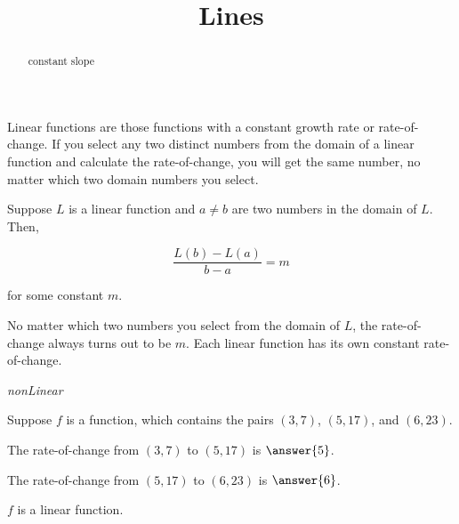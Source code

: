 \documentclass{ximera}
\title{Lines}
\begin{document}
\begin{abstract}
constant slope
\end{abstract}
\maketitle


Linear functions are those functions with a constant growth rate or rate-of-change.  If you select any two distinct numbers from the domain of a linear function and calculate the rate-of-change, you will get the same number, no matter which two domain numbers you select.

Suppose $L$ is a linear function and $a \ne b$ are two numbers in the domain of $L$. Then, 

\[    \frac{L(b) - L(a)}{b - a} = m   \]

for some constant $m$.


No matter which two numbers you select from the domain of $L$, the rate-of-change always turns out to be $m$.  Each linear function has its own constant rate-of-change.



\begin{example} \textit{nonLinear}

\end{example}

Suppose $f$ is a function, which contains the pairs $(3, 7)$, $(5, 17)$, and $(6, 23)$.


The rate-of-change from $(3, 7)$ to $(5, 17)$ is $\answer{5}$.

The rate-of-change from $(5, 17)$ to $(6, 23)$ is $\answer{6}$.

$f$ is a linear function.
\begin{multipleChoice}
\end{multipleChoice}
\end{document}
